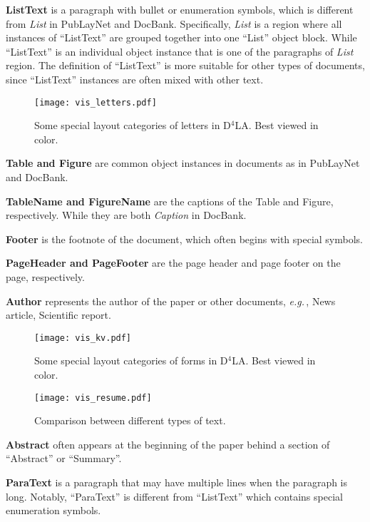 \documentclass[10pt,twocolumn,letterpaper]{article}
\def\eg{\emph{e.g.}\,}
\begin{document}
\noindent
\textbf{ListText} is a paragraph with bullet or enumeration symbols,
which is different from \textit{List} in PubLayNet and DocBank.
Specifically,  \textit{List}  is a region where all instances of ``ListText''  are grouped together into one ``List'' object block.
While ``ListText'' is an individual object instance that is one of the paragraphs of \textit{List} region.
The definition of ``ListText'' is more suitable for other types of documents, 
since ``ListText'' instances are often mixed with other text.

\begin{figure}[t]\centering
\texttt{[image: vis\_letters.pdf]}
\caption{Some special layout categories of letters in D$^4$LA. Best viewed in color.}
 \label{fig:vis_letters}
\end{figure} 


\noindent
\textbf{Table  and Figure} are common object instances in documents as in PubLayNet and DocBank.

\noindent
\textbf{TableName  and FigureName} are the captions of the Table and Figure, respectively.
While they are both \textit{Caption} in DocBank. 

\noindent
\textbf{Footer} is the footnote of the document, which often begins with special symbols.

\noindent
\textbf{PageHeader and PageFooter} are the page header and page footer on the page, respectively.

\noindent
\textbf{Author} represents the author of the paper or other documents, \eg, News article, Scientific report.


\begin{figure*}[t]\centering
\texttt{[image: vis\_kv.pdf]}
\caption{Some special layout categories of forms in D$^4$LA. Best viewed in color.}
 \label{fig:vis_kv}
\end{figure*} 

\begin{figure}[!htp]\centering
\texttt{[image: vis\_resume.pdf]}
\caption{Comparison between different types of text.}
 \label{fig:vis_res}
\end{figure} 

\noindent
\textbf{Abstract} often appears at the beginning of the paper behind a section of ``Abstract'' or ``Summary''.

\noindent
\textbf{ParaText} is a paragraph that may have multiple lines when the paragraph is long.
Notably, ``ParaText'' is different from ``ListText'' which contains special enumeration symbols.
\end{document}
